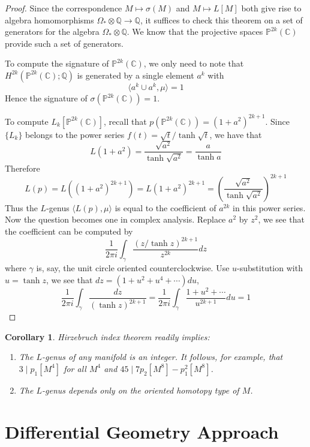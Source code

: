 \documentclass[12pt]{article}
\theoremstyle{plain}
\newtheorem{corollary}[equation]{Corollary}
\theoremstyle{definition}
\newcommand{\IC}{\mathbb{C}}
\newcommand{\IP}{\mathbb{P}}
\newcommand{\IQ}{\mathbb{Q}}
\newcommand\tensor{{\otimes}}
\newcommand{\<}{\langle}
\renewcommand{\>}{\rangle}
\newcommand{\Ohm}{\Omega}
\begin{document}
\begin{proof}
Since the correspondence $M \mapsto \sigma(M)$ and $M \mapsto L[M]$ both give rise to algebra homomorphisms $\Ohm_* \tensor \IQ \to \IQ$, it suffices to check this theorem on a set of generators for the algebra $\Ohm_* \tensor \IQ$. We know that the projective spaces $\IP^{2k}(\IC)$ provide such a set of generators. 

To compute the signature of $\IP^{2k}(\IC)$, we only need to note that $H^{2k}(\IP^{2k}(\IC); \IQ)$ is generated by a single element $a^k$ with 
$$ \< a^k \cup a^k, \mu \> = 1$$
Hence the signature of $\sigma(\IP^{2k}(\IC)) = 1$. 

To compute $L_k[\IP^{2k}(\IC)]$, recall that $p(\IP^{2k}(\IC)) = (1 + a^2)^{2k + 1}$. Since $\{ L_k \}$ belongs to the power series $f(t) = \sqrt{t}/\tanh \sqrt{t}$, we have that 
$$ L(1 + a^2) = \frac{\sqrt{a^2}}{\tanh \sqrt{a^2}} = \frac{a}{\tanh a} $$
Therefore 
$$ L(p) = L((1 + a^2)^{2k + 1}) = L(1 + a^2)^{2k + 1} = (\frac{\sqrt{a^2}}{\tanh \sqrt{a^2}})^{2k + 1} $$
Thus the $L$-genus $\< L(p), \mu \>$ is equal to the coefficient of $a^{2k}$ in this power series. Now the question becomes one in complex analysis. Replace $a^2$ by $z^2$, we see that the coefficient can be computed by 
$$ \frac{1}{2 \pi i} \int_\gamma \frac{(z/ \tanh z)^{2k + 1}}{z^{2k}} dz $$
where $\gamma$ is, say, the unit circle oriented counterclockwise. 
Use $u$-substitution with $u = \tanh z$, we see that $dz = (1 + u^2 + u^4 + \cdots) du$, 
$$ \frac{1}{2 \pi i} \int_\gamma \frac{dz}{(\tanh z)^{2k + 1}} = \frac{1}{2 \pi i} \int_\gamma \frac{1 + u^2 + \cdots}{u^{2k + 1}} du = 1$$ 
\end{proof}

\begin{corollary}Hirzebruch index theorem readily implies: 
\begin{enumerate}
\item The $L$-genus of any manifold is an integer. It follows, for example, that $3 \mid p_1[M^4]$ for all $M^4$ and $45 \mid 7 p_2[M^8] - p_1^2[M^8]$. 
\item The $L$-genus depends only on the oriented homotopy type of $M$. 
\end{enumerate}
\end{corollary}



\section{Differential Geometry Approach}
\end{document}
